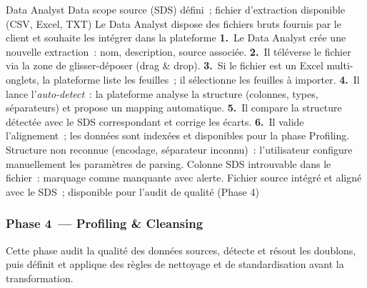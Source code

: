   {Data Analyst}
  {Data scope source (SDS) défini~; fichier d'extraction disponible (CSV, Excel, TXT)}
  {Le Data Analyst dispose des fichiers bruts fournis par le client et souhaite les intégrer dans la plateforme}
  {\textbf{1.}~Le Data Analyst crée une nouvelle extraction~: nom, description, source associée.\newline
   \textbf{2.}~Il téléverse le fichier via la zone de glisser-déposer (drag \& drop).\newline
   \textbf{3.}~Si le fichier est un Excel multi-onglets, la plateforme liste les feuilles~; il sélectionne les feuilles à importer.\newline
   \textbf{4.}~Il lance l'\textit{auto-detect}~: la plateforme analyse la structure (colonnes, types, séparateurs) et propose un mapping automatique.\newline
   \textbf{5.}~Il compare la structure détectée avec le SDS correspondant et corrige les écarts.\newline
   \textbf{6.}~Il valide l'alignement~; les données sont indexées et disponibles pour la phase Profiling.}
  {Structure non reconnue (encodage, séparateur inconnu)~: l'utilisateur configure manuellement les paramètres de parsing. Colonne SDS introuvable dans le fichier~: marquage comme manquante avec alerte.}
  {Fichier source intégré et aligné avec le SDS~; disponible pour l'audit de qualité (Phase 4)}
\fi %

\iffalse %
\subsubsection*{Phase 4~--- Profiling \& Cleansing}
\label{subsubsec:uc-phase4}

Cette phase audit la qualité des données sources, détecte et résout les doublons, puis définit et applique des règles de nettoyage et de standardisation avant la transformation.

